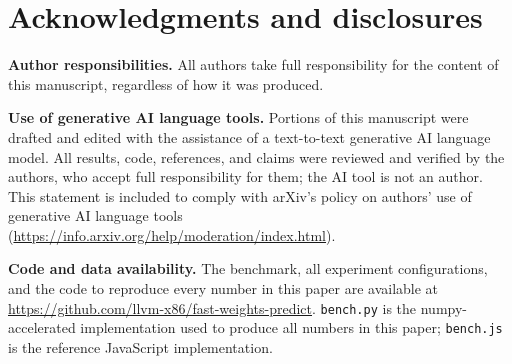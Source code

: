 \documentclass[11pt]{article}
\begin{document}
\section*{Acknowledgments and disclosures}

\textbf{Author responsibilities.} All authors take full responsibility for the content of this
manuscript, regardless of how it was produced.

\textbf{Use of generative AI language tools.} Portions of this manuscript were drafted and
edited with the assistance of a text-to-text generative AI language model. All results, code,
references, and claims were reviewed and verified by the authors, who accept full
responsibility for them; the AI tool is not an author. This statement is included to comply
with arXiv's policy on authors' use of generative AI language tools
(\url{https://info.arxiv.org/help/moderation/index.html}).

\textbf{Code and data availability.} The benchmark, all experiment configurations, and the code
to reproduce every number in this paper are available at
\url{https://github.com/llvm-x86/fast-weights-predict}. \texttt{bench.py} is the
numpy-accelerated implementation used to produce all numbers in this paper; \texttt{bench.js}
is the reference JavaScript implementation.
\end{document}
